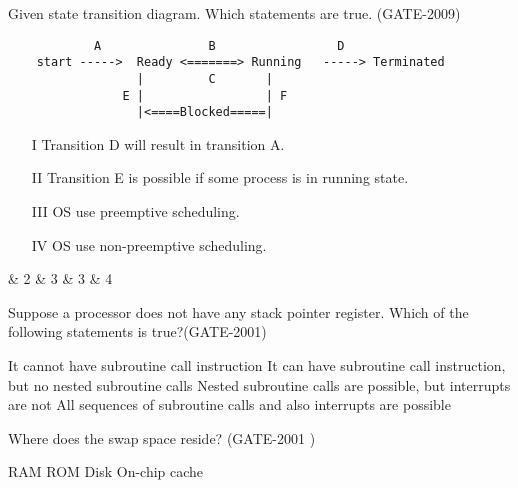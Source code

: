 
\begin{questyle}

  \question  Given state transition diagram. Which statements are true. (GATE-2009)
  \begin{lstlisting}
            A               B                 D
    start ----->  Ready <=======> Running   -----> Terminated
                  |         C       |
                E |                 | F
                  |<====Blocked=====|
  \end{lstlisting}
  \begin{enumerate}
      \item[I] Transition D will result in transition A.
      \item[II] Transition E is possible if some process is in running state.
      \item[III] OS use preemptive scheduling.
      \item[IV] OS use non-preemptive scheduling.
   \end{enumerate}

  \begin{oneparchoices}
     \& 2
     \& 3
     \& 3
     \& 4
  \end{oneparchoices}

\end{questyle}




\begin{questyle}

  \question  Suppose a processor does not have any stack pointer register. Which of the following statements is true?(GATE-2001)

  \begin{choices}
    \CorrectChoice It cannot have subroutine call instruction
    \choice It can have subroutine call instruction, but no nested subroutine calls
    \choice Nested subroutine calls are possible, but interrupts are not
    \choice All sequences of subroutine calls and also interrupts are possible
  \end{choices}

  \end{questyle}




\begin{questyle}

  \question  Where does the swap space reside? (GATE-2001 )

  \begin{oneparchoices}
    \choice RAM
    \choice ROM
    \CorrectChoice Disk
    \choice On-chip cache
  \end{oneparchoices}

  \end{questyle}


